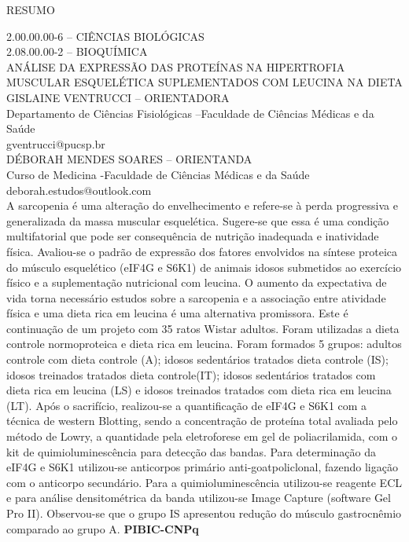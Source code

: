 \newpage
\begin{center}
    RESUMO
\end{center}
2.00.00.00-6 – CIÊNCIAS BIOLÓGICAS 
\\
2.08.00.00-2 – BIOQUÍMICA
\\
ANÁLISE   DA   EXPRESSÃO   DAS   PROTEÍNAS  NA HIPERTROFIA  MUSCULAR  ESQUELÉTICA SUPLEMENTADOS COM LEUCINA NA DIETA 
\\
GISLAINE VENTRUCCI – ORIENTADORA
\\
Departamento de Ciências Fisiológicas –Faculdade de Ciências Médicas e da Saúde
\\
gventrucci@pucsp.br
\\
DÉBORAH MENDES SOARES – ORIENTANDA 
\\
Curso de Medicina -Faculdade de Ciências Médicas e da Saúde
\\
deborah.estudos@outlook.com
\\

A  sarcopenia  é  uma  alteração  do  envelhecimento  e  refere-se  à  perda  progressiva  e generalizada  da  massa  muscular  esquelética.  Sugere-se  que  essa  é uma  condição multifatorial  que  pode  ser  consequência  de  nutrição  inadequada  e  inatividade  física. Avaliou-se o padrão de expressão dos fatores envolvidos na síntese proteica do músculo esquelético  (eIF4G  e  S6K1)  de  animais  idosos  submetidos  ao  exercício  físico  e  a suplementação   nutricional   com   leucina.   O   aumento   da   expectativa   de   vida   torna necessário estudos sobre a sarcopenia e a associação entre atividade física e uma dieta rica  em  leucina  é  uma  alternativa  promissora.  Este  é  continuação  de  um  projeto  com  35 ratos  Wistar  adultos.  Foram  utilizadas  a  dieta  controle  normoproteica  e  dieta  rica  em leucina.  Foram  formados  5  grupos:  adultos  controle  com  dieta  controle  (A);  idosos sedentários  tratados  dieta  controle  (IS);  idosos  treinados  tratados  dieta  controle(IT); idosos  sedentários  tratados  com  dieta  rica  em  leucina  (LS)  e  idosos  treinados  tratados com dieta rica em leucina (LT). Após o sacrifício, realizou-se a quantificação de eIF4G e S6K1 com a técnica de western Blotting, sendo a concentração de proteína total avaliada pelo método de Lowry, a quantidade pela eletroforese em gel de poliacrilamida, com o kit de quimioluminescência para detecção das bandas. Para determinação da eIF4G e S6K1 utilizou-se   anticorpos   primário   anti-goatpoliclonal,   fazendo   ligação com   o   anticorpo secundário.   Para   a   quimioluminescência   utilizou-se   reagente   ECL   e   para   análise densitométrica da banda utilizou-se Image Capture (software Gel Pro II). Observou-se que o  grupo  IS  apresentou  redução  do  músculo  gastrocnêmio  comparado  ao  grupo  A.  \textbf{PIBIC-CNPq}
